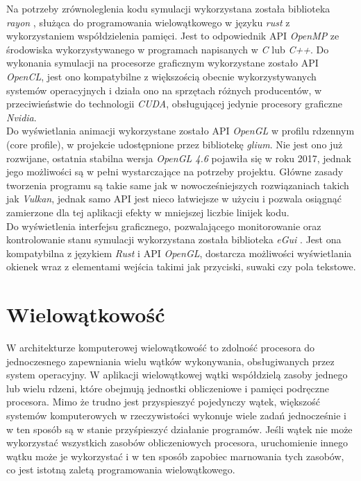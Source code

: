 \documentclass[12pt, letterpaper]{report}
\begin{document}
    Na potrzeby zrównoleglenia kodu symulacji wykorzystana została biblioteka \emph{rayon} \cite{rayon}, służąca
    do programowania wielowątkowego w języku \emph{rust} z wykorzystaniem współdzielenia pamięci. 
    Jest to odpowiednik API \emph{OpenMP} ze środowiska wykorzystywanego w 
    programach napisanych w \emph{C} lub \emph{C++}. 
    Do wykonania symulacji na procesorze graficznym wykorzystane zostało API \emph{OpenCL}, jest ono kompatybilne
    z większością obecnie wykorzystywanych systemów operacyjnych i działa ono na sprzętach różnych producentów, 
    w przeciwieństwie do technologii \emph{CUDA}, obsługującej jedynie procesory graficzne \emph{Nvidia}. \\
    
    Do wyświetlania animacji wykorzystane zostało API \emph{OpenGL} w profilu rdzennym (core profile), w projekcie
    udostępnione przez bibliotekę \emph{glium}. Nie jest ono już rozwijane, ostatnia stabilna wersja 
    \emph{\emph{OpenGL} 4.6} pojawiła się w roku 2017, jednak jego możliwości są w pełni wystarczające
    na potrzeby projektu. Główne zasady tworzenia programu są takie same jak w nowocześniejszych rozwiązaniach 
    takich jak \emph{Vulkan}, jednak samo API jest nieco łatwiejsze w użyciu i pozwala osiągnąć zamierzone 
    dla tej aplikacji efekty w mniejszej liczbie linijek kodu. \\

    Do wyświetlenia interfejsu graficznego, pozwalającego monitorowanie oraz kontrolowanie stanu symulacji  
    wykorzystana została biblioteka \emph{eGui} \cite{egui}. Jest ona kompatybilna z językiem \emph{Rust} 
    i API \emph{OpenGL}, dostarcza możliwości wyświetlania okienek wraz z elementami wejścia takimi
    jak przyciski, suwaki czy pola tekstowe. \\


    \clearpage
    \section{Wielowątkowość}

    W architekturze komputerowej wielowątkowość to zdolność procesora do 
    jednoczesnego zapewniania wielu wątków wykonywania, obsługiwanych przez 
    system operacyjny. W aplikacji wielowątkowej wątki współdzielą zasoby 
    jednego lub wielu rdzeni, które obejmują jednostki obliczeniowe i pamięci 
    podręczne procesora. Mimo że trudno jest przyspieszyć pojedynczy wątek, 
    większość systemów komputerowych w rzeczywistości wykonuje wiele zadań jednocześnie i 
    w ten sposób są w stanie przyśpieszyć działanie programów. Jeśli wątek nie może wykorzystać 
    wszystkich zasobów obliczeniowych procesora, uruchomienie innego wątku może je wykorzystać i 
    w ten sposób zapobiec marnowania tych zasobów, co jest istotną zaletą programowania wielowątkowego. \\
\end{document}
